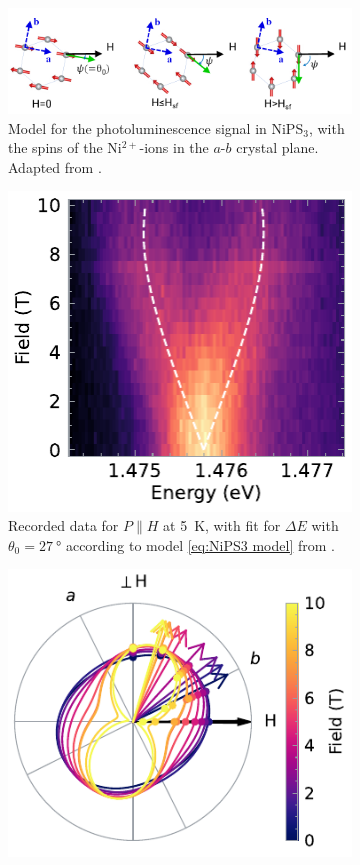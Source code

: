 \documentclass[
	twoside,
	parskip=half,
	a4paper,
]{scrbook}
\begin{document}
\begin{figure}
	\centering
	\begin{subfigure}{\textwidth}
		\centering
		\includegraphics[width=.8\textwidth]{../figures/NiPS3_magnon_S2.png}
		\caption{Model for the photoluminescence signal in NiPS$_3$, with the spins of the Ni$^{2+}$-ions in the $a$-$b$ crystal plane. Adapted from \cite[Figure S2]{NiPS3_magnon_gap}.}
		\label{fig:NiPS3 linear model}
	\end{subfigure}
	\begin{subfigure}[t]{2.5in}
		\centering
		\includegraphics{../figures/2024-04-21 NiPS3 single polarisation.pdf}
		\caption{Recorded data for $P\parallel H$ at \SI{5}{K}, with fit for $\Delta E$ with $\theta_0 = \SI{27}{\degree}$ according to model \autoref{eq:NiPS3 model} from \cite{NiPS3_magnon_gap}.}
		\label{fig:NiPS3 model}
	\end{subfigure}
	\begin{subfigure}[t]{3in}
		\centering
		\includegraphics{../figures/2024-04-07 NiPS3 polarisation.pdf}

\end{subfigure}
\end{figure}
\end{document}
